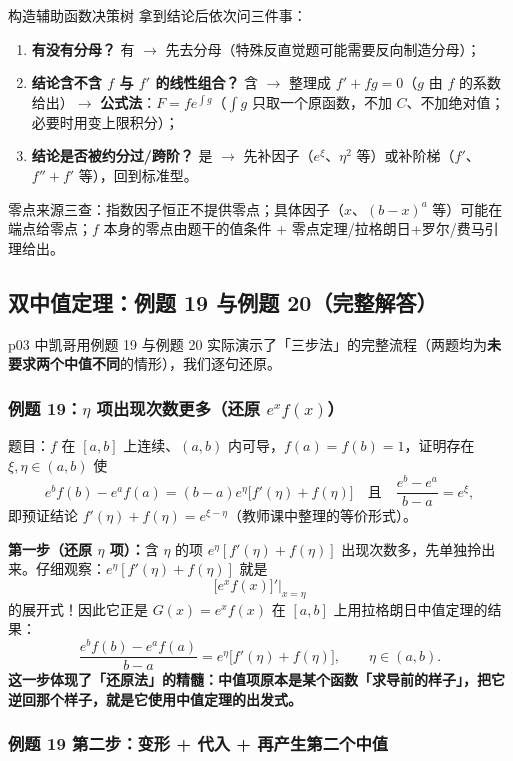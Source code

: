 \documentclass[a4paper]{article}
\begin{document}
\begin{importantbox}{构造辅助函数决策树}
拿到结论后依次问三件事：
\begin{enumerate}
\item \textbf{有没有分母？} 有 $\rightarrow$ 先去分母（特殊反直觉题可能需要反向制造分母）；
\item \textbf{结论含不含 $f$ 与 $f'$ 的线性组合？} 含 $\rightarrow$ 整理成 $f'+fg=0$（$g$ 由 $f$ 的系数给出）$\rightarrow$ \textbf{公式法}：$F=fe^{\int g}$（$\int g$ 只取一个原函数，不加 $C$、不加绝对值；必要时用变上限积分）；
\item \textbf{结论是否被约分过/跨阶？} 是 $\rightarrow$ 先补因子（$e^{\xi}$、$\eta^2$ 等）或补阶梯（$f'$、$f''+f'$ 等），回到标准型。
\end{enumerate}
零点来源三查：指数因子恒正不提供零点；具体因子（$x$、$(b-x)^a$ 等）可能在端点给零点；$f$ 本身的零点由题干的值条件 + 零点定理/拉格朗日+罗尔/费马引理给出。
\end{importantbox}


\subsection{双中值定理：例题 19 与例题 20（完整解答）}

p03 中凯哥用例题 19 与例题 20 实际演示了「三步法」的完整流程（两题均为\textbf{未要求两个中值不同}的情形），我们逐句还原。

\subsubsection{例题 19：$\eta$ 项出现次数更多（还原 $e^x f(x)$）}

题目：$f$ 在 $[a,b]$ 上连续、$(a,b)$ 内可导，$f(a)=f(b)=1$，证明存在 $\xi,\eta\in(a,b)$ 使
\[
e^{b}f(b)-e^{a}f(a)=(b-a)e^{\eta}\big[f'(\eta)+f(\eta)\big]\quad\text{且}\quad \frac{e^{b}-e^{a}}{b-a}=e^{\xi},
\]
即预证结论 $f'(\eta)+f(\eta)=e^{\xi-\eta}$（教师课中整理的等价形式）。

\textbf{第一步（还原 $\eta$ 项）：}含 $\eta$ 的项 $e^{\eta}[f'(\eta)+f(\eta)]$ 出现次数多，先单独拎出来。仔细观察：$e^{\eta}[f'(\eta)+f(\eta)]$ 就是\[
\big[e^x f(x)\big]'\big|_{x=\eta}
\]
的展开式！因此它正是 $G(x)=e^x f(x)$ 在 $[a,b]$ 上用拉格朗日中值定理的结果：
\[
\frac{e^{b}f(b)-e^{a}f(a)}{b-a}=e^{\eta}\big[f'(\eta)+f(\eta)\big],\qquad \eta\in(a,b).
\]
\textbf{这一步体现了「还原法」的精髓：中值项原本是某个函数「求导前的样子」，把它逆回那个样子，就是它使用中值定理的出发式。}

\subsubsection{例题 19 第二步：变形 + 代入 + 再产生第二个中值}
\end{document}
